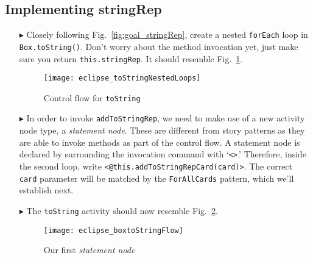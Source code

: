 \newpage
\hypertarget{stringRep tex}{}
\subsection{Implementing stringRep}
\texHeader

\vspace{0.5cm}

\begin{itemize}
  
\item[$\blacktriangleright$] Closely following Fig.~\ref{fig:goal_stringRep}, create a nested \texttt{forEach} loop in \texttt{Box.toString()}.
Don't worry about the method invocation yet, just make sure you return \texttt{this.stringRep}. It should resemble Fig.~\ref{fig:emptyLoops}.

\begin{figure}[htp]
\begin{center}
  \texttt{[image: eclipse\_toStringNestedLoops]}
  \caption{Control flow for \texttt{toString}}
  \label{fig:emptyLoops}
\end{center}
\end{figure}

\item[$\blacktriangleright$] In order to invoke \texttt{addToStringRep}, we need to make use of a new activity node type, a \emph{statement node}. These are
different from story patterns as they are able to invoke methods as part of the control flow. A statement node is declared by surrounding the invocation command
with  `\texttt{<>}.' Therefore, inside the second loop, write \texttt{<@this.addToStringRepCard(card)>}. The correct \texttt{card} parameter will be matched by
the \texttt{ForAllCards} pattern, which we'll establish next.

\vspace{0.5cm}

\item[$\blacktriangleright$] The \texttt{toString} activity should now resemble Fig.~\ref{fig:toStringFlow}.

\vspace{0.5cm}

\begin{figure}[htp]
\begin{center}
  \texttt{[image: eclipse\_boxtoStringFlow]}
  \caption{Our first \emph{statement node}}
  \label{fig:toStringFlow}
\end{center}
\end{figure}


\end{itemize}
